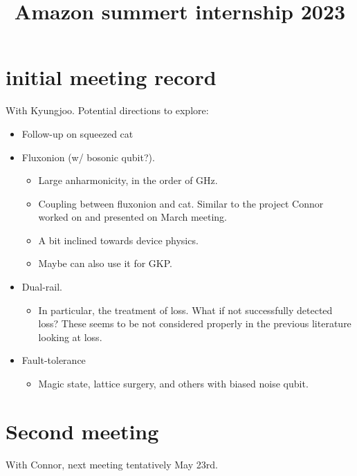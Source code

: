 \documentclass[a4paper,11pt]{article}
\begin{document}
\title*{\Large Amazon summert internship 2023}


\section{initial meeting record}

With Kyungjoo. Potential directions to explore:

\begin{itemize}
    \item Follow-up on squeezed cat 
    \item Fluxonion (w/ bosonic qubit?). 
    \begin{itemize}
        \item Large anharmonicity, in the order of GHz.
        \item Coupling between fluxonion and cat. Similar to the project Connor worked on and presented on March meeting.
        \item A bit inclined towards device physics.
        \item Maybe can also use it for GKP.
    \end{itemize}
    \item Dual-rail. 
    \begin{itemize}
        \item In particular, the treatment of loss. What if not successfully detected loss? These seems to be not considered properly in the previous literature looking at loss.
    \end{itemize}
    \item Fault-tolerance
    \begin{itemize}
        \item Magic state, lattice surgery, and others with biased noise qubit.
    \end{itemize}
\end{itemize}

\section{Second meeting}

With Connor, next meeting tentatively May 23rd. 
\end{document}
